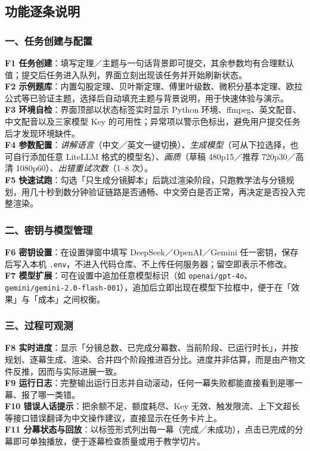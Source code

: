 \documentclass[11pt,a4paper]{ctexart}
\begin{document}
\subsection{功能逐条说明}

\subsubsection{一、任务创建与配置}

\textbf{F1 任务创建}：填写定理／主题与一句话背景即可提交，其余参数均有合理默认值；提交后任务进入队列，界面立刻出现该任务并开始刷新状态。\\
\textbf{F2 示例题库}：内置勾股定理、贝叶斯定理、傅里叶级数、微积分基本定理、欧拉公式等已验证主题，选择后自动填充主题与背景说明，用于快速体验与演示。\\
\textbf{F3 环境自检}：界面顶部以状态标签实时显示 Python 环境、ffmpeg、英文配音、中文配音以及三家模型 Key 的可用性；异常项以警示色标出，避免用户提交任务后才发现环境缺件。\\
\textbf{F4 参数配置}：\emph{讲解语言}（中文／英文一键切换）、\emph{生成模型}（可从下拉选择，也可自行添加任意 LiteLLM 格式的模型名）、\emph{画质}（草稿 480p15／推荐 720p30／高清 1080p60）、\emph{出错重试次数}（1--8 次）。\\
\textbf{F5 快速试跑}：勾选「只生成分镜脚本」后跳过渲染阶段，只跑教学法与分镜规划，用几十秒到数分钟验证链路是否通畅、中文旁白是否正常，再决定是否投入完整渲染。

\subsubsection{二、密钥与模型管理}

\textbf{F6 密钥设置}：在设置弹窗中填写 DeepSeek／OpenAI／Gemini 任一密钥，保存后写入本机 \texttt{.env}，不进入代码仓库、不上传任何服务器；留空即表示不修改。\\
\textbf{F7 模型扩展}：可在设置中追加任意模型标识（如 \texttt{openai/gpt-4o}、\texttt{gemini/gemini-2.0-flash-001}），追加后立即出现在模型下拉框中，便于在「效果」与「成本」之间权衡。

\subsubsection{三、过程可观测}

\textbf{F8 实时进度}：显示「分镜总数、已完成分幕数、当前阶段、已运行时长」，并按规划、逐幕生成、渲染、合并四个阶段推进百分比。进度并非估算，而是由产物文件反推，因而与实际进展一致。\\
\textbf{F9 运行日志}：完整输出运行日志并自动滚动，任何一幕失败都能直接看到是哪一幕、报了哪一类错。\\
\textbf{F10 错误人话提示}：把余额不足、额度耗尽、Key 无效、触发限流、上下文超长等接口错误翻译为中文操作建议，直接显示在任务卡片上。\\
\textbf{F11 分幕状态与回放}：以标签形式列出每一幕（完成／未成功），点击已完成的分幕即可单独播放，便于逐幕检查质量或用于教学切片。
\end{document}
